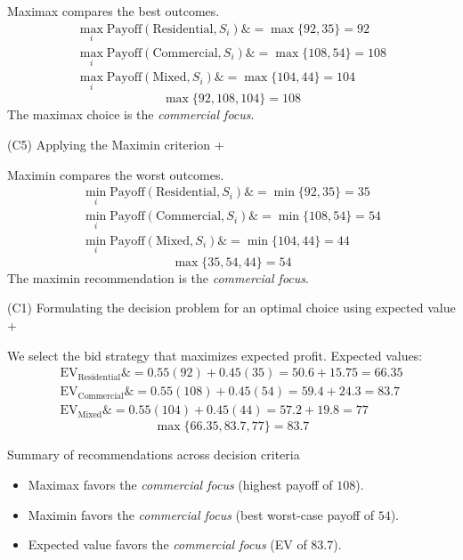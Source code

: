 \documentclass[11pt]{article}
\begin{document}
	
	Maximax compares the best outcomes.
	\[
	\begin{aligned}
		\max_i \text{Payoff}(\text{Residential}, S_i) \&= \max\{92, 35\} = 92 \\
		\max_i \text{Payoff}(\text{Commercial}, S_i) \&= \max\{108, 54\} = 108 \\
		\max_i \text{Payoff}(\text{Mixed}, S_i) \&= \max\{104, 44\} = 104
	\end{aligned}
	\]
	\[
	\max\{92, 108, 104\} = 108
	\]
	The maximax choice is the \emph{commercial focus}.
	
	
	
	
	
	(C5) Applying the Maximin criterion
	+
	
	
	Maximin compares the worst outcomes.
	\[
	\begin{aligned}
		\min_i \text{Payoff}(\text{Residential}, S_i) \&= \min\{92, 35\} = 35 \\
		\min_i \text{Payoff}(\text{Commercial}, S_i) \&= \min\{108, 54\} = 54 \\
		\min_i \text{Payoff}(\text{Mixed}, S_i) \&= \min\{104, 44\} = 44
	\end{aligned}
	\]
	\[
	\max\{35, 54, 44\} = 54
	\]
	The maximin recommendation is the \emph{commercial focus}.
	
	
	
	
	
	(C1) Formulating the decision problem for an optimal choice using expected value
	+
	
	
	We select the bid strategy that maximizes expected profit. Expected values:
	\[
	\begin{aligned}
		\mathrm{EV}_{\text{Residential}} \&= 0.55(92) + 0.45(35) = 50.6 + 15.75 = 66.35 \\
		\mathrm{EV}_{\text{Commercial}} \&= 0.55(108) + 0.45(54) = 59.4 + 24.3 = 83.7 \\
		\mathrm{EV}_{\text{Mixed}} \&= 0.55(104) + 0.45(44) = 57.2 + 19.8 = 77
	\end{aligned}
	\]
	\[
	\max\{66.35, 83.7, 77\} = 83.7
	\]
	
	Summary of recommendations across decision criteria
	\begin{itemize}
		\item Maximax favors the \emph{commercial focus} (highest payoff of $108$).
		\item Maximin favors the \emph{commercial focus} (best worst-case payoff of $54$).
		\item Expected value favors the \emph{commercial focus} (EV of $83.7$).
	\end{itemize}
	
\end{document}
